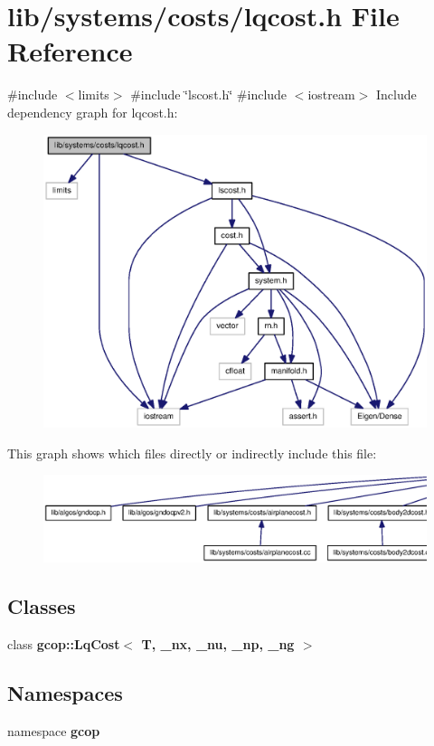 \section{lib/systems/costs/lqcost.h \-File \-Reference}
\label{lqcost_8h}
{\ttfamily \#include $<$limits$>$}\*
{\ttfamily \#include \char`\"{}lscost.\-h\char`\"{}}\*
{\ttfamily \#include $<$iostream$>$}\*
\-Include dependency graph for lqcost.\-h\-:
\nopagebreak
\begin{figure}[H]
\begin{center}
\leavevmode
\includegraphics[width=350pt]{lqcost_8h__incl}
\end{center}
\end{figure}
\-This graph shows which files directly or indirectly include this file\-:
\nopagebreak
\begin{figure}[H]
\begin{center}
\leavevmode
\includegraphics[width=350pt]{lqcost_8h__dep__incl}
\end{center}
\end{figure}
\subsection*{\-Classes}
\begin{DoxyCompactItemize}
\item 
class {\bf gcop\-::\-Lq\-Cost$<$ T, \-\_\-nx, \-\_\-nu, \-\_\-np, \-\_\-ng $>$}
\end{DoxyCompactItemize}
\subsection*{\-Namespaces}
\begin{DoxyCompactItemize}
\item 
namespace {\bf gcop}
\end{DoxyCompactItemize}
